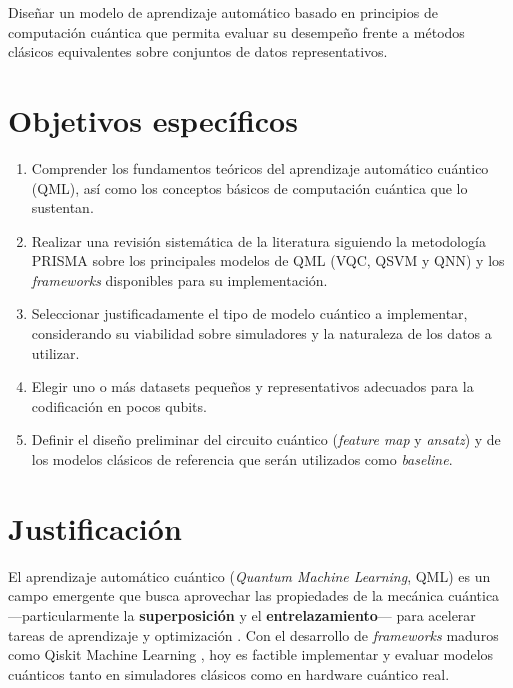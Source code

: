 \documentclass[a4paper,10pt,twocolumn]{article}
\begin{document}
Dise\~nar un modelo de aprendizaje autom\'atico basado en principios de
computaci\'on cu\'antica que permita evaluar su desempe\~no frente a
m\'etodos cl\'asicos equivalentes sobre conjuntos de datos
representativos.

\section{Objetivos espec\'ificos}

\begin{enumerate}
    \item Comprender los fundamentos te\'oricos del aprendizaje
    autom\'atico cu\'antico (QML), as\'i como los conceptos b\'asicos
    de computaci\'on cu\'antica que lo sustentan.

    \item Realizar una revisi\'on sistem\'atica de la literatura
    siguiendo la metodolog\'ia PRISMA sobre los principales modelos de
    QML (VQC, QSVM y QNN) y los \textit{frameworks} disponibles para su
    implementaci\'on.

    \item Seleccionar justificadamente el tipo de modelo cu\'antico
    a implementar, considerando su viabilidad sobre simuladores y la
    naturaleza de los datos a utilizar.

    \item Elegir uno o m\'as datasets peque\~nos y representativos
    adecuados para la codificaci\'on en pocos qubits.

    \item Definir el dise\~no preliminar del circuito cu\'antico
    (\textit{feature map} y \textit{ansatz}) y de los modelos cl\'asicos
    de referencia que ser\'an utilizados como \textit{baseline}.
\end{enumerate}

\section{Justificaci\'on}

El aprendizaje autom\'atico cu\'antico (\textit{Quantum Machine Learning},
QML) es un campo emergente que busca aprovechar las propiedades de la
mec\'anica cu\'antica ---particularmente la \textbf{superposici\'on} y el
\textbf{entrelazamiento}--- para acelerar tareas de aprendizaje y
optimizaci\'on \citep{biamonte2017}. Con el desarrollo de
\textit{frameworks} maduros como Qiskit Machine Learning
\citep{qiskit2024}, hoy es factible implementar y evaluar modelos
cu\'anticos tanto en simuladores cl\'asicos como en hardware cu\'antico
real.
\end{document}
